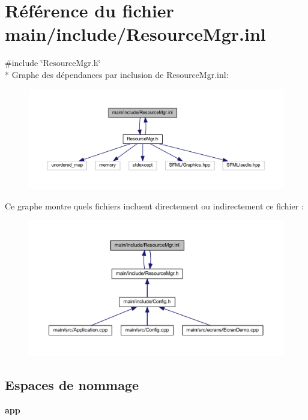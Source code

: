 \section{Référence du fichier main/include/\+Resource\+Mgr.inl}
\label{_resource_mgr_8inl}
{\ttfamily \#include \char`\"{}Resource\+Mgr.\+h\char`\"{}}\\*
Graphe des dépendances par inclusion de Resource\+Mgr.\+inl\+:\nopagebreak
\begin{figure}[H]
\begin{center}
\leavevmode
\includegraphics[width=350pt]{_resource_mgr_8inl__incl}
\end{center}
\end{figure}
Ce graphe montre quels fichiers incluent directement ou indirectement ce fichier \+:\nopagebreak
\begin{figure}[H]
\begin{center}
\leavevmode
\includegraphics[width=350pt]{_resource_mgr_8inl__dep__incl}
\end{center}
\end{figure}
\subsection*{Espaces de nommage}
\begin{DoxyCompactItemize}
\item 
 {\bf app}
\end{DoxyCompactItemize}
